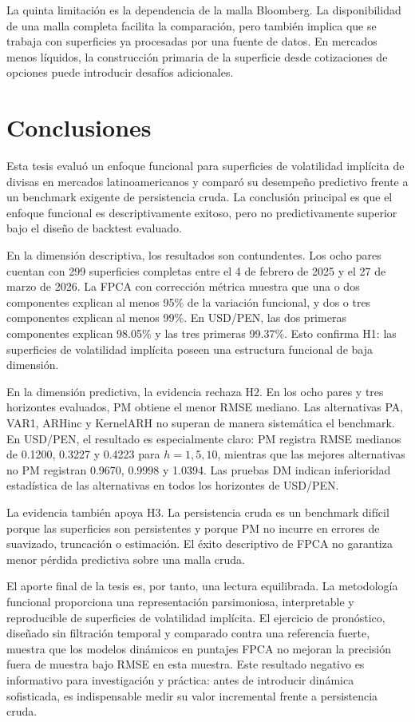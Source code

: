 \documentclass[12pt,a4paper]{article}
\newcommand{\SVIs}{superficies de volatilidad implícita}
\begin{document}
La quinta limitación es la dependencia de la malla Bloomberg. La disponibilidad de una malla completa facilita la comparación, pero también implica que se trabaja con superficies ya procesadas por una fuente de datos. En mercados menos líquidos, la construcción primaria de la superficie desde cotizaciones de opciones puede introducir desafíos adicionales.

\section{Conclusiones}

Esta tesis evaluó un enfoque funcional para \SVIs{} de divisas en mercados latinoamericanos y comparó su desempeño predictivo frente a un benchmark exigente de persistencia cruda. La conclusión principal es que el enfoque funcional es descriptivamente exitoso, pero no predictivamente superior bajo el diseño de backtest evaluado.

En la dimensión descriptiva, los resultados son contundentes. Los ocho pares cuentan con 299 superficies completas entre el 4 de febrero de 2025 y el 27 de marzo de 2026. La FPCA con corrección métrica muestra que una o dos componentes explican al menos 95\% de la variación funcional, y dos o tres componentes explican al menos 99\%. En USD/PEN, las dos primeras componentes explican 98.05\% y las tres primeras 99.37\%. Esto confirma H1: las \SVIs{} poseen una estructura funcional de baja dimensión.

En la dimensión predictiva, la evidencia rechaza H2. En los ocho pares y tres horizontes evaluados, PM obtiene el menor RMSE mediano. Las alternativas PA, VAR1, ARHinc y KernelARH no superan de manera sistemática el benchmark. En USD/PEN, el resultado es especialmente claro: PM registra RMSE medianos de 0.1200, 0.3227 y 0.4223 para \(h=1,5,10\), mientras que las mejores alternativas no PM registran 0.9670, 0.9998 y 1.0394. Las pruebas DM indican inferioridad estadística de las alternativas en todos los horizontes de USD/PEN.

La evidencia también apoya H3. La persistencia cruda es un benchmark difícil porque las superficies son persistentes y porque PM no incurre en errores de suavizado, truncación o estimación. El éxito descriptivo de FPCA no garantiza menor pérdida predictiva sobre una malla cruda.

El aporte final de la tesis es, por tanto, una lectura equilibrada. La metodología funcional proporciona una representación parsimoniosa, interpretable y reproducible de superficies de volatilidad implícita. El ejercicio de pronóstico, diseñado sin filtración temporal y comparado contra una referencia fuerte, muestra que los modelos dinámicos en puntajes FPCA no mejoran la precisión fuera de muestra bajo RMSE en esta muestra. Este resultado negativo es informativo para investigación y práctica: antes de introducir dinámica sofisticada, es indispensable medir su valor incremental frente a persistencia cruda.
\end{document}
